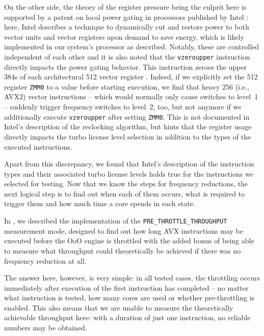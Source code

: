 On the other side, the theory of the register pressure being the culprit here is supported by a patent on local power gating in processors published by Intel \cite{bonen2016performing}: here, Intel describes a technique to dynamically cut and restore power to both vector units and vector registers upon demand to save energy, which is likely implemented in our system's processor as described. Notably, these are controlled independent of each other and it is also noted that the \texttt{vzeroupper} instruction directly impacts the power gating behavior. This instruction zeroes the upper \SI{384}{\bit}s of each architectural \SI{512}{\bit} vector register \cite{intelsdminstructionreference}. Indeed, if we explicitly set the \SI{512}{\bit} register \texttt{ZMM0} to a value before starting execution, we find that heavy \SI{256}{\bit} (i.e., \gls{AVX2}) vector instructions -- which would normally only cause switches to level~1 -- suddenly trigger frequency switches to level~2, too, but not anymore if we additionally execute \texttt{vzeroupper} after setting \texttt{ZMM0}. This is not documented in Intel's description of the reclocking algorithm, but hints that the register usage directly impacts the turbo license level selection in addition to the types of the executed instructions.

Apart from this discrepancy, we found that Intel's description of the instruction types and their associated turbo license levels holds true for the instructions we selected for testing. Now that we know the steps for frequency reductions, the next logical step is to find out when each of them occurs, what is required to trigger them and how much time a core spends in each state.

In , we described the implementation of the \texttt{PRE\_THROTTLE\_THROUGHPUT} measurement mode, designed to find out how long \gls{AVX} instructions may be executed before the \acrlong{OoO} engine is throttled with the added bonus of being able to measure what throughput could theoretically be achieved if there was no frequency reduction at all.

The answer here, however, is very simple: in all tested cases, the throttling occurs immediately after execution of the first instruction has completed -- no matter what instruction is tested, how many cores are used or whether pre-throttling is enabled. This also means that we are unable to measure the theoretically achievable throughput here: with a duration of just one instruction, no reliable numbers may be obtained.

